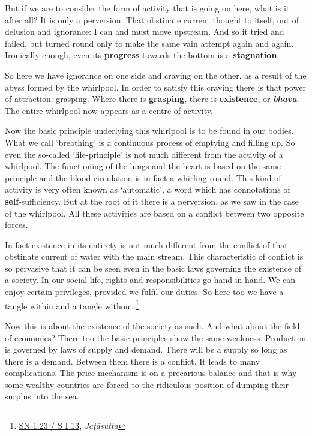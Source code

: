 But if we are to consider the form of activity that is going on here, what is it after all? It is only a perversion. That obstinate current thought to itself, out of delusion and ignorance: I can and must move upstream. And so it tried and failed, but turned round only to make the same vain attempt again and again. Ironically enough, even its \textbf{progress} towards the bottom is a \textbf{stagnation}.

So here we have ignorance on one side and craving on the other, as a result of the abyss formed by the whirlpool. In order to satisfy this craving there is that power of attraction: grasping. Where there is \textbf{grasping}, there is \textbf{existence}, or \textbf{\emph{bhava}}. The entire whirlpool now appears as a centre of activity.

Now the basic principle underlying this whirlpool is to be found in our bodies. What we call `breathing' is a continuous process of emptying and filling up. So even the so-called `life-principle' is not much different from the activity of a whirlpool. The functioning of the lungs and the heart is based on the same principle and the blood circulation is in fact a whirling round. This kind of activity is very often known as `automatic', a word which has connotations of \textbf{self}-sufficiency. But at the root of it there is a perversion, as we saw in the case of the whirlpool. All these activities are based on a conflict between two opposite forces.

In fact existence in its entirety is not much different from the conflict of that obstinate current of water with the main stream. This characteristic of conflict is so pervasive that it can be seen even in the basic laws governing the existence of a society. In our social life, rights and responsibilities go hand in hand. We can enjoy certain privileges, provided we fulfil our duties. So here too we have a tangle within and a tangle without.\footnote{\href{https://suttacentral.net/sn1.23/pli/ms}{SN 1.23 / S I 13}, \emph{Jaṭāsutta}}

Now this is about the existence of the society as such. And what about the field of economics? There too the basic principles show the same weakness. Production is governed by laws of supply and demand. There will be a supply so long as there is a demand. Between them there is a conflict. It leads to many complications. The price mechanism is on a precarious balance and that is why some wealthy countries are forced to the ridiculous position of dumping their surplus into the sea.

